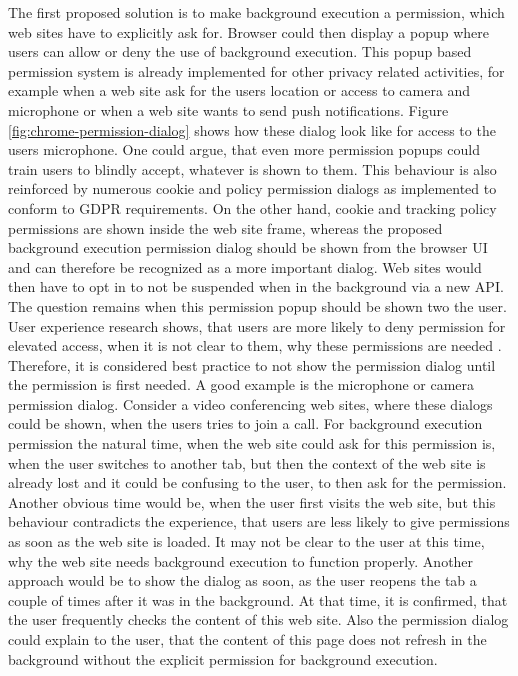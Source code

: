 \documentclass[
	ruledheaders=section,%
	class=report,%
	thesis={type=bachelor},%
	accentcolor=9c,%
	custommargins=true,%
	marginpar=false,%
	parskip=half-,%
	fontsize=11pt,%
]{tudapub}
\begin{document}
  The first proposed solution is to make background execution a permission, which web sites have to explicitly ask for. Browser could then display a popup where users can allow or deny the use of background execution. This popup based permission system is already implemented for other privacy related activities, for example when a web site ask for the users location or access to camera and microphone or when a web site wants to send push notifications. Figure \ref{fig:chrome-permission-dialog} shows how these dialog look like for access to the users microphone. One could argue, that even more permission popups could train users to blindly accept, whatever is shown to them. This behaviour is also reinforced by numerous cookie and policy permission dialogs as implemented to conform to GDPR requirements. On the other hand, cookie and tracking policy permissions are shown inside the web site frame, whereas the proposed background execution permission dialog should be shown from the browser UI and can therefore be recognized as a more important dialog. Web sites would then have to opt in to not be suspended when in the background via a new API. The question remains when this permission popup should be shown two the user. User experience research shows, that users are more likely to deny permission for elevated access, when it is not clear to them, why these permissions are needed \cite{bonne2017exploring}. Therefore, it is considered best practice to not show the permission dialog until the permission is first needed. A good example is the microphone or camera permission dialog. Consider a video conferencing web sites, where these dialogs could be shown, when the users tries to join a call. For background execution permission the natural time, when the web site could ask for this permission is, when the user switches to another tab, but then the context of the web site is already lost and it could be confusing to the user, to then ask for the permission. Another obvious time would be, when the user first visits the web site, but this behaviour contradicts the experience, that users are less likely to give permissions as soon as the web site is loaded. It may not be clear to the user at this time, why the web site needs background execution to function properly. Another approach would be to show the dialog as soon, as the user reopens the tab a couple of times after it was in the background. At that time, it is confirmed, that the user frequently checks the content of this web site. Also the permission dialog could explain to the user, that the content of this page does not refresh in the background without the explicit permission for background execution.
\end{document}
